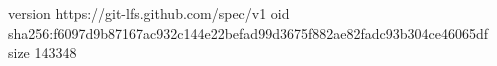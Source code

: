 version https://git-lfs.github.com/spec/v1
oid sha256:f6097d9b87167ac932c144e22befad99d3675f882ae82fadc93b304ce46065df
size 143348
